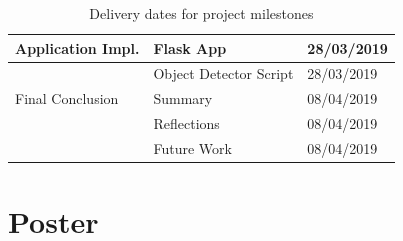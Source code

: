 \documentclass[12pt]{report}
\begin{document}
\begin{appendices}
\begin{table}[ht!]
\begin{tabular}{|l|l|l|}
Application Impl.         & Flask App                & 28/03/2019           \\ \hline
                          & Object Detector Script   & 28/03/2019           \\ \hline         
Final Conclusion          & Summary                  & 08/04/2019           \\ \hline
                          & Reflections              & 08/04/2019           \\ \hline
                          & Future Work              & 08/04/2019           \\ \hline                          
\end{tabular}
\caption{Delivery dates for project milestones}
\end{table}

\chapter{Poster}

\end{appendices}
\end{document}
